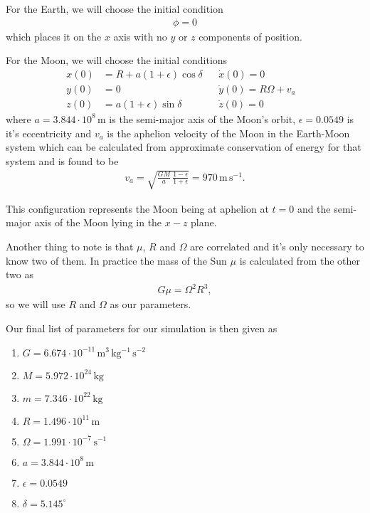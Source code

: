 \documentclass[12pt,a4paper]{article}
\begin{document}
For the Earth, we will choose the initial condition
%
\begin{align}
\phi = 0
\end{align}
%
which places it on the $x$ axis with no $y$ or $z$ components of position.

For the Moon, we will choose the initial conditions
%
\begin{align}
x(0) &= R + a (1 + \epsilon) \cos \delta && \dot{x}(0) = 0& \nonumber \\
y(0) &= 0 && \dot{y}(0) = R \Omega + v_a& \nonumber \\
z(0) &= a (1 + \epsilon) \sin \delta && \dot{z}(0) = 0&
\end{align}
%
where $a = 3.844 \cdot 10^{8} \, \mathrm{m}$ is the semi-major axis of the Moon's orbit, $\epsilon = 0.0549$ is it's eccentricity and $v_a$ is the aphelion velocity of the Moon in the Earth-Moon system which can be calculated from approximate conservation of energy for that system and is found to be
%
\begin{align}
v_a = \sqrt{\frac{G M}{a} \, \frac{1 - \epsilon}{1 + \epsilon}} = 970 \, \mathrm{m \, s^{-1}}.
\end{align}

This configuration represents the Moon being at aphelion at $t = 0$ and the semi-major axis of the Moon lying in the $x-z$ plane.

Another thing to note is that $\mu$, $R$ and $\Omega$ are correlated and it's only necessary to know two of them. In practice the mass of the Sun $\mu$ is calculated from the other two as
%
\begin{align}
G \mu = \Omega^2 R^3,
\end{align}
%
so we will use $R$ and $\Omega$ as our parameters.

Our final list of parameters for our simulation is then given as \cite{podatoci}
%
\begin{multicols}{2}
\begin{enumerate}
\item $G = 6.674 \cdot 10^{-11} \, \mathrm{m^3 \, kg^{-1} \, s^{-2}}$

\item $M = 5.972 \cdot 10^{24} \, \mathrm{kg}$

\item $m = 7.346 \cdot 10^{22} \, \mathrm{kg}$

\item $R = 1.496 \cdot 10^{11} \, \mathrm{m}$

\item $\Omega = 1.991 \cdot 10^{-7} \, \mathrm{s^{-1}}$

\item $a = 3.844 \cdot 10^{8} \, \mathrm{m}$

\item $\epsilon = 0.0549$

\item $\delta = 5.145 ^{\circ}$
\end{enumerate}
\end{multicols}
\end{document}
